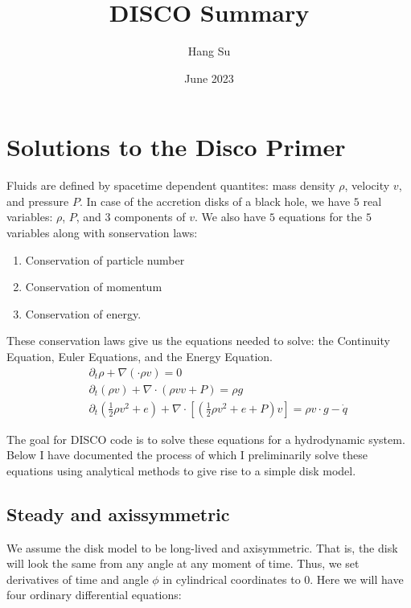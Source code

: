 \documentclass{article}
\title{DISCO Summary}
\author{Hang Su}
\date{June 2023}
\begin{document}
\maketitle

\section{Solutions to the Disco Primer}
Fluids are defined by spacetime dependent quantites: mass density $\rho$, velocity $v$, and pressure $P$.
In case of the accretion disks of a black hole, we have $5$ real variables: $\rho$, $P$, and $3$
components of $v$. We also have $5$ equations for the $5$ variables along with sonservation laws: 
\begin{enumerate}
    \item Conservation of particle number
    \item Conservation of momentum
    \item Conservation of energy.
\end{enumerate}

These conservation laws give us the equations needed to solve: the Continuity Equation, Euler Equations,
and the Energy Equation.
\begin{eqnarray}
    && \partial_t \rho + \nabla (\cdot \rho v) = 0 \nonumber \\
    && \partial_t (\rho v) + \nabla \cdot (\rho vv + P) =  \rho g \nonumber \\
    && \partial _t (\frac{1}{2} \rho v^2 + e) + \nabla \cdot \left[\left(\frac{1}{2
    } \rho v^2 + e + P \right) v \right] = \rho v \cdot g - \dot q
\end{eqnarray}

The goal for DISCO code is to solve these equations for a hydrodynamic system. Below I have documented
the process of which I preliminarily solve these equations using analytical methods to give rise to 
a simple disk model. 

\subsection{Steady and axissymmetric}

We assume the disk model to be long-lived and axisymmetric. That is, the disk will look the same
from any angle at any moment of time. Thus, we set derivatives of time and angle $\phi$ in cylindrical coordinates
to $0$. Here we will have four ordinary differential equations:
\end{document}
